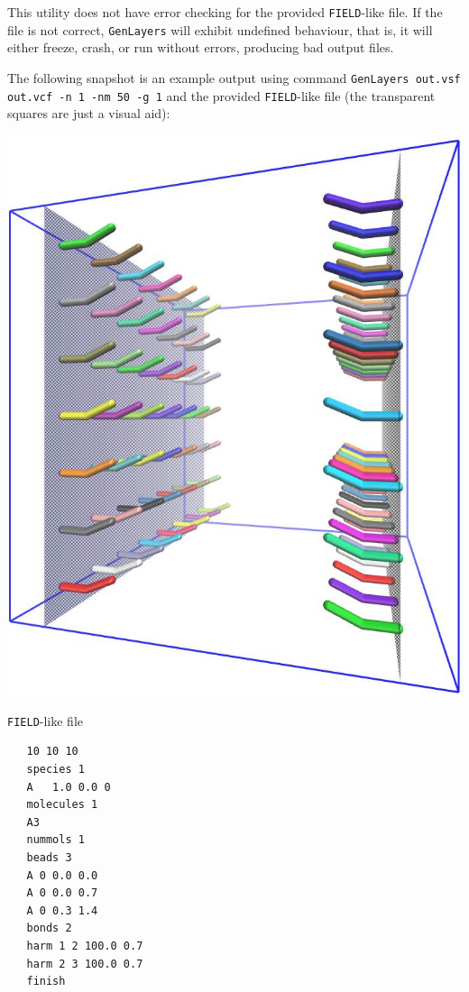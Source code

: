 This utility does not have error checking for the provided
\texttt{FIELD}-like file. If the file is not correct, \texttt{GenLayers}
will exhibit undefined behaviour, that is, it will either freeze, crash, or
run without errors, producing bad output files.

The following snapshot is an example output using command \texttt{GenLayers
out.vsf out.vcf -n 1 -nm 50 -g 1} and the provided \texttt{FIELD}-like file
(the transparent squares are just a visual aid):

\hfill
\begin{minipage}{0.4\textwidth}

  \includegraphics[width=\textwidth]{GenLayers-478ctac.jpg}
\end{minipage}
\hfill
\begin{minipage}{0.3\textwidth}
  \centering
  \texttt{FIELD}-like file
  \vspace{-1em}

\begin{verbatim}
   10 10 10
   species 1
   A   1.0 0.0 0
   molecules 1
   A3
   nummols 1
   beads 3
   A 0 0.0 0.0
   A 0 0.0 0.7
   A 0 0.3 1.4
   bonds 2
   harm 1 2 100.0 0.7
   harm 2 3 100.0 0.7
   finish
\end{verbatim}
\end{minipage}

